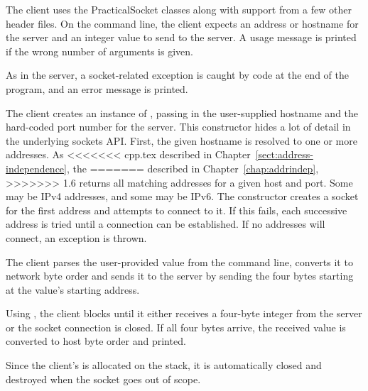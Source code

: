 
\begin{topcode}


The client uses the PracticalSocket classes along with support from a
few other header files.  On the command line, the client expects an
address or hostname for the server and an integer value to send to the
server.  A usage message is printed if the wrong number of arguments is given.


As in the server, a socket-related exception is caught by code at the
end of the program, and an error message is printed.


The client creates an instance of , passing in the
user-supplied hostname and the hard-coded port number for the server.
This constructor hides a lot of detail in the underlying sockets API.
First, the given hostname is resolved to one or more addresses.  As
<<<<<<< cpp.tex
described in Chapter~\ref{sect:address-independence}, the
=======
described in Chapter~\ref{chap:addrindep}, 
>>>>>>> 1.6
 returns all matching addresses for a given host
and port.  Some may be IPv4 addresses, and some may be IPv6.  The
 constructor creates a socket for the first address and
attempts to connect to it.  If this fails, each successive address is
tried until a connection can be established.  If no addresses will
connect, an exception is thrown.


The client parses the user-provided value from the command line,
converts it to network byte order and sends it to the server by
sending the four bytes starting at the value's starting address.



Using , the client blocks until it either receives a
four-byte integer from the server or the socket connection is closed.
If all four bytes arrive, the received value is converted to
host byte order and printed.


Since the client's  is allocated on the stack, it is
automatically closed and destroyed when the socket goes out of scope.

\end{topcode}

